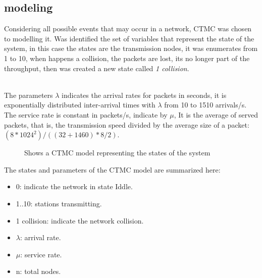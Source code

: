 \documentclass[conference]{IEEEtran}
\begin{document}
\subsection{modeling}


Considering all possible events that may occur in a network, CTMC was chosen to modelling it. Was identified the set of variables that represent the state of the system, in this case the states are the transmission nodes, it was enumerates from 1 to 10, when happens a collision, the packets are lost, its no longer part of the throughput, then was created a new state called \textit{1 collision}.

\\The parameters \( \lambda \)  indicates the arrival rates for packets  in seconds, it is exponentially distributed inter-arrival times with  \( \lambda \) from 10 to 1510 arrivals/s. The service rate is constant in packets/s, indicate by  \( \mu \), It is the average of served packets, that is, the transmission speed divided by the average size of a packet: \( (8 *1024^2) / ((32+1460)*8/2) \).

\bigskip


\begin{figure}[H]
	\centering	 
	\caption{Shows a CTMC model representing the states of the system}%
\end{figure}

The states and parameters of the CTMC model are summarized here:

\begin{itemize}
\item 0: indicate the network in state Iddle.
\item 1..10: stations transmitting.
\item 1 collision: indicate the network collision.
\item \( \lambda \): arrival rate.
\item  \( \mu \): service rate.
\item n: total nodes.
\end{itemize}
 
\end{document}
